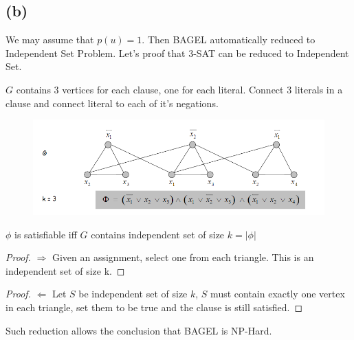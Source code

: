 \documentclass{article}
\begin{document}
\subsection*{(b)}
	\par We may assume that $p(u) = 1$. Then BAGEL automatically reduced to Independent Set Problem. Let's proof that 3-SAT can be reduced to Independent Set.
	\par $G$ contains 3 vertices for each clause, one for each literal. Connect 3 literals in a clause and connect literal to each of it's negations. 
	\begin{figure}[h]
		\includegraphics[width=\textwidth]{Pic/Demo}
	\end{figure}
	$\phi$ is satisfiable iff $G$ contains independent set of size $k = |\phi|$
	\begin{proof} $\Rightarrow$
	Given an assignment, select one from each triangle. This is an independent set of size k.
	\end{proof}
	\begin{proof} $\Leftarrow$
	Let $S$ be independent set of size $k$, $S$ must contain exactly one vertex in each triangle, set them to be true and the clause is still satisfied.
	\end{proof}
	Such reduction allows the conclusion that BAGEL is NP-Hard.
\end{document}
